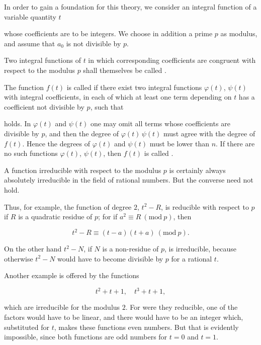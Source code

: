 In order to gain a foundation for this theory, we consider an integral function of a variable quantity $t$


whose coefficients are to be integers. We choose in addition a prime $p$ as modulus, and assume that $a_0$ is not divisible by $p$.

Two integral functions of $t$ in which corresponding coefficients are congruent with respect to the modulus $p$ shall themselves be called .

The function $f(t)$ is called  if there exist two integral functions $\varphi(t)$, $\psi(t)$ with integral coefficients, in each of which at least one term depending on $t$ has a coefficient not divisible by $p$, such that


holds. In $\varphi(t)$ and $\psi(t)$ one may omit all terms whose coefficients are divisible by $p$, and then the degree of $\varphi(t)\,\psi(t)$ must agree with the degree of $f(t)$. Hence the degrees of $\varphi(t)$ and $\psi(t)$ must be lower than $n$. If there are no such functions $\varphi(t)$, $\psi(t)$, then $f(t)$ is called .

A function irreducible with respect to the modulus $p$ is certainly always absolutely irreducible in the field of rational numbers. But the converse need not hold.

Thus, for example, the function of degree $2$, $t^2 - R$, is reducible with respect to $p$ if $R$ is a quadratic residue of $p$; for if $a^2 \equiv R\ (\mathrm{mod}\ p)$, then

\[
t^2 - R \equiv (t-a)(t+a)\ (\mathrm{mod}\ p).
\]

On the other hand $t^2 - N$, if $N$ is a non-residue of $p$, is irreducible, because otherwise $t^2 - N$ would have to become divisible by $p$ for a rational $t$.

Another example is offered by the functions

\[
t^2 + t + 1, \quad t^3 + t + 1,
\]

which are irreducible for the modulus $2$. For were they reducible, one of the factors would have to be linear, and there would have to be an integer which, substituted for $t$, makes these functions even numbers. But that is evidently impossible, since both functions are odd numbers for $t = 0$ and $t = 1$.
